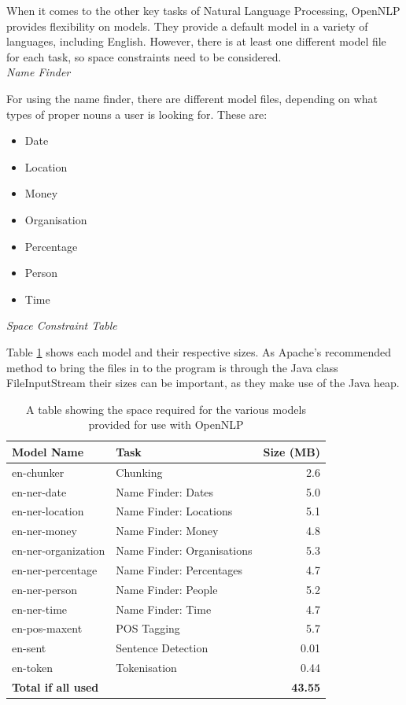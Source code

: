 \documentclass[12pt]{article}
\begin{document}
When it comes to the other key tasks of Natural Language Processing, OpenNLP provides flexibility on models. They provide a default model in a variety of languages, including English. However, there is at least one different model file for each task, so space constraints need to be considered. \\

\emph{Name Finder}

For using the name finder, there are different model files, depending on what types of proper nouns a user is looking for. These are: 

\begin{itemize}
	\item Date
	\item Location
	\item Money
	\item Organisation
	\item Percentage
	\item Person
	\item Time \\
\end{itemize} 

\emph{Space Constraint Table}

Table \ref{opennlpspace} shows each model and their respective sizes. As Apache's recommended method to bring the files in to the program is through the Java class FileInputStream their sizes can be important, as they make use of the Java heap.

\begin{table}[H]
	\centering
	\begin{tabular}{l|l|r}
		\textbf{Model Name} & \textbf{Task} & \textbf{Size (MB)} \\ \hline
		en-chunker & Chunking & 2.6 \\ \hline
		en-ner-date & Name Finder: Dates & 5.0 \\ \hline
		en-ner-location & Name Finder: Locations & 5.1 \\ \hline
		en-ner-money & Name Finder: Money & 4.8 \\ \hline
		en-ner-organization & Name Finder: Organisations & 5.3 \\ \hline
		en-ner-percentage & Name Finder: Percentages & 4.7 \\ \hline
		en-ner-person & Name Finder: People & 5.2 \\ \hline
		en-ner-time & Name Finder: Time & 4.7 \\ \hline
		en-pos-maxent & POS Tagging & 5.7 \\ \hline
		en-sent & Sentence Detection & 0.01 \\ \hline
		en-token & Tokenisation & 0.44 \\ \hline
		\textbf{Total if all used} & & \textbf{43.55} \\ \hline
	\end{tabular}
	\caption[Space used for OpenNLP models]{A table showing the space required for the various models provided for use with OpenNLP}
	\label{opennlpspace}
\end{table}
\end{document}
